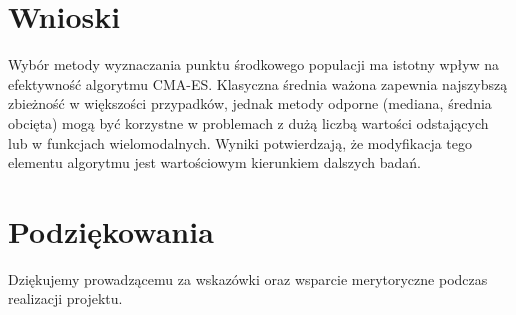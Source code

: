 \documentclass{article}
\begin{document}
\section{Wnioski}
Wybór metody wyznaczania punktu środkowego populacji ma istotny wpływ na efektywność algorytmu CMA-ES. Klasyczna średnia ważona zapewnia najszybszą zbieżność w większości przypadków, jednak metody odporne (mediana, średnia obcięta) mogą być korzystne w problemach z dużą liczbą wartości odstających lub w funkcjach wielomodalnych. Wyniki potwierdzają, że modyfikacja tego elementu algorytmu jest wartościowym kierunkiem dalszych badań.

\section*{Podziękowania}
Dziękujemy prowadzącemu za wskazówki oraz wsparcie merytoryczne podczas realizacji projektu.
\end{document}
